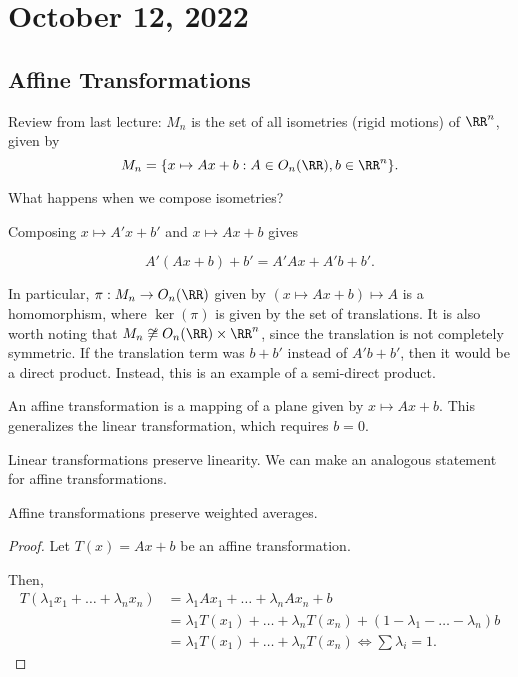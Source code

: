 \section{October 12, 2022}

\subsection{Affine Transformations}

Review from last lecture: $M_n$ is the set of all isometries (rigid motions) of $\RR^n$, given by 
\[M_n = \{x\mapsto Ax+b: A\in O_n(\RR), b\in \RR^n\}.\]

\begin{example}
\exlabel

What happens when we compose isometries?
\end{example}

Composing $x\mapsto A'x+b'$ and $x\mapsto Ax+b$ gives

\[A'(Ax+b) + b' = A'Ax + A'b+b'.\]

In particular, $\pi : M_n\rightarrow O_n(\RR)$ given by $(x\mapsto Ax+b)\mapsto A$ is a homomorphism, where $\ker(\pi)$ is given by the set of translations. It is also worth noting that $M_n\not\cong O_n(\RR)\times \RR^n$, since the translation is not completely symmetric. If the translation term was $b+b'$ instead of $A'b+b'$, then it would be a direct product. Instead, this is an example of a \ac{semi-direct product}. 

\begin{definition}

An \ac{affine transformation} is a mapping of a plane given by $x\mapsto Ax+b$. This generalizes the linear transformation, which requires $b=0$. 
\end{definition}

Linear transformations preserve linearity. We can make an analogous statement for affine transformations.

\begin{theorem}
\proplabel

Affine transformations preserve weighted averages.
\end{theorem}

\begin{proof}
Let $T(x) = Ax+b$ be an affine transformation. 

Then, 
\begin{align*}
    T(\lambda_1x_1 + \hdots + \lambda_nx_n) &= \lambda_1Ax_1 + \hdots + \lambda_nAx_n + b \\
    &= \lambda_1 T(x_1) + \hdots + \lambda_n T(x_n) + (1-\lambda_1 - \hdots - \lambda_n)b \\
    &= \lambda_1 T(x_1) + \hdots + \lambda_n T(x_n) \iff \sum \lambda_i = 1.
\end{align*}
\end{proof}

